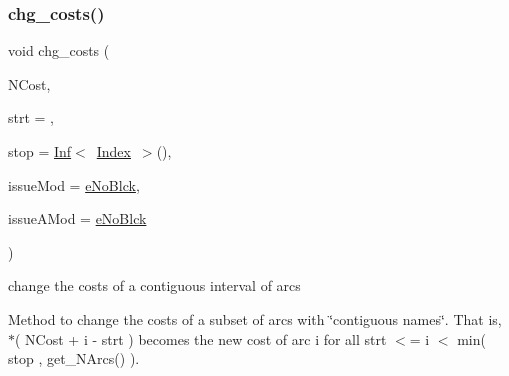 \subsubsection{\texorpdfstring{chg\+\_\+costs()}{chg\_costs()}\hspace{0.1cm}{\footnotesize\ttfamily [1/2]}}
{\footnotesize\ttfamily void chg\+\_\+costs (\begin{DoxyParamCaption}\item[{\mbox{\hyperlink{class_s_m_spp__di__unipi__it_1_1_m_c_f_block_aa2211b659beb942cfb7618c11033831e}{c\+\_\+\+Vec\+\_\+\+C\+Number\+\_\+it}}}]{N\+Cost,  }\item[{\mbox{\hyperlink{class_s_m_spp__di__unipi__it_1_1_m_c_f_block_aee6156e2ce80720d57a082d80f39d8cc}{c\+\_\+\+Index}}}]{strt = {},  }\item[{\mbox{\hyperlink{class_s_m_spp__di__unipi__it_1_1_m_c_f_block_ad53d6229d7ec28555a9c9c2fd9abf773}{Index}}}]{stop = {\ttfamily \mbox{\hyperlink{class_s_m_spp__di__unipi__it_1_1_inf}{Inf}}$<$~\mbox{\hyperlink{class_s_m_spp__di__unipi__it_1_1_m_c_f_block_ad53d6229d7ec28555a9c9c2fd9abf773}{Index}}~$>$()},  }\item[{\mbox{\hyperlink{group___modification___t_y_p_e_s_ga544246d8c462e9a2d817c2c30797968f}{c\+\_\+\+Mod\+Param}}}]{issue\+Mod = {\ttfamily \mbox{\hyperlink{group___modification___t_y_p_e_s_gga48fddcdd03a03f49b7e389ca1ed938d4ada69e89c5f46e563d8a13cfa6830c136}{e\+No\+Blck}}},  }\item[{\mbox{\hyperlink{group___modification___t_y_p_e_s_ga544246d8c462e9a2d817c2c30797968f}{c\+\_\+\+Mod\+Param}}}]{issue\+A\+Mod = {\ttfamily \mbox{\hyperlink{group___modification___t_y_p_e_s_gga48fddcdd03a03f49b7e389ca1ed938d4ada69e89c5f46e563d8a13cfa6830c136}{e\+No\+Blck}}} }\end{DoxyParamCaption})}



change the costs of a contiguous interval of arcs 

Method to change the costs of a subset of arcs with \char`\"{}contiguous names\char`\"{}. That is, $\ast$( N\+Cost + i -\/ strt ) becomes the new cost of arc i for all strt $<$= i $<$ min( stop , get\+\_\+\+N\+Arcs() ).

